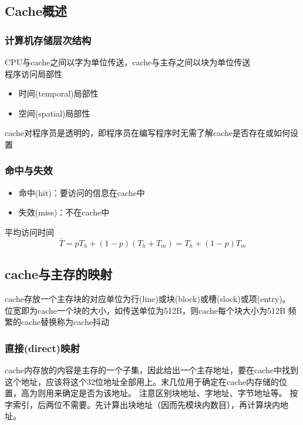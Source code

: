 \subsection{Cache概述}
\subsubsection{计算机存储层次结构}
CPU与cache之间以字为单位传送，cache与主存之间以块为单位传送\\
程序访问局部性
\begin{itemize}
	\item 时间(temporal)局部性
	\item 空间(spatial)局部性
\end{itemize}
cache对程序员是透明的，即程序员在编写程序时无需了解cache是否存在或如何设置

\subsubsection{命中与失效}
\begin{itemize}
	\item 命中(hit)：要访问的信息在cache中
	\item 失效(miss)：不在cache中
\end{itemize}
平均访问时间
\[\bar{T}=pT_h+(1-p)(T_h+T_m)=T_h+(1-p)T_m\]

\subsection{cache与主存的映射}
cache存放一个主存块的对应单位为行(line)或块(block)或槽(slock)或项(entry)。\\
位宽即为cache一个块的大小，如传送单位为512B，则cache每个块大小为512B
频繁的cache替换称为cache抖动
\subsubsection{直接(direct)映射}
cache内存放的内容是主存的一个子集，因此给出一个主存地址，要在cache中找到这个地址，应该将这个32位地址全部用上。末几位用于确定在cache内存储的位置，高为则用来确定是否为该地址。
注意区别块地址、字地址、字节地址等。
按字索引，后两位不需要。先计算出块地址（因而先模块内数目），再计算块内地址。

